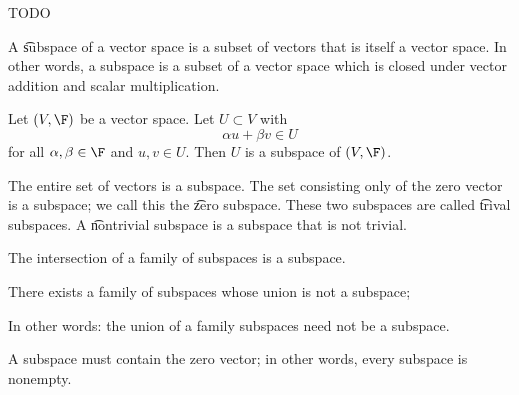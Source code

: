 

TODO


A \t{subspace} of a vector space is a subset of vectors that is itself a vector space.
In other words, a subspace is a subset of a vector space which is closed under vector addition and scalar multiplication.


Let $(V, \F)$ be a vector space.
Let $U \subset V$ with
$$
  \alpha u + \beta v \in U
$$
for all $\alpha, \beta \in \F$ and $u, v \in U$.
Then $U$ is a subspace of $(V, \F)$.


The entire set of vectors is a subspace.
The set consisting only of the zero vector is a subspace; we call this the \t{zero subspace}.
These two subspaces are called \t{trival subspaces}.
A \t{nontrivial subspace} is a subspace that is not trivial.


\begin{prop}
  The intersection of a family of subspaces is a subspace.
\end{prop}

\begin{prop}
  There exists a family of subspaces whose union is not a subspace;

  \begin{remark}
  In other words: the union of a family subspaces need not be a subspace.
  \end{remark}

\end{prop}

\begin{prop}
  A subspace must contain the zero vector; in other words, every subspace is nonempty.
\end{prop}
